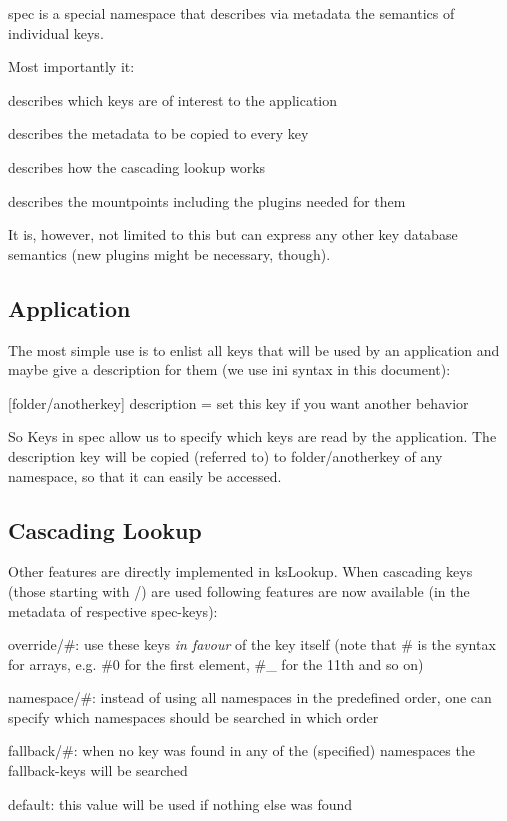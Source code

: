 spec is a special namespace that describes via metadata the semantics of individual keys.

Most importantly it\+:


\begin{DoxyEnumerate}
\item describes which keys are of interest to the application
\item describes the metadata to be copied to every key
\item describes how the cascading lookup works
\item describes the mountpoints including the plugins needed for them
\end{DoxyEnumerate}

It is, however, not limited to this but can express any other key database semantics (new plugins might be necessary, though).

\subsection*{Application}

The most simple use is to enlist all keys that will be used by an application and maybe give a description for them (we use ini syntax in this document)\+:


\begin{DoxyCode}
[mykey]

[folder/anotherkey]
description = set this key if you want another behavior
\end{DoxyCode}


So Keys in {\ttfamily spec} allow us to specify which keys are read by the application. The description key will be copied (referred to) to {\ttfamily folder/anotherkey} of any namespace, so that it can easily be accessed.

\subsection*{Cascading Lookup}

Other features are directly implemented in {\ttfamily ks\+Lookup}. When cascading keys (those starting with {\ttfamily /}) are used following features are now available (in the metadata of respective {\ttfamily spec}-\/keys)\+:


\begin{DoxyItemize}
\item {\ttfamily override/\#}\+: use these keys {\itshape in favour} of the key itself (note that {\ttfamily \#} is the syntax for arrays, e.\+g. {\ttfamily \#0} for the first element, {\ttfamily \#\+\_} for the 11th and so on)
\item {\ttfamily namespace/\#}\+: instead of using all namespaces in the predefined order, one can specify which namespaces should be searched in which order
\item {\ttfamily fallback/\#}\+: when no key was found in any of the (specified) namespaces the {\ttfamily fallback}-\/keys will be searched
\item {\ttfamily default}\+: this value will be used if nothing else was found
\end{DoxyItemize}

